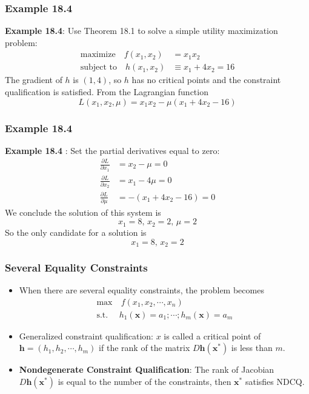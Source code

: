 \documentclass[9pt,aspectratio=169]{beamer}
\begin{document}
						
\begin{frame}
	\frametitle{Example 18.4} \textbf{Example 18.4}: Use Theorem 18.1 to
    solve a simple utility maximization problem:
	\begin{align}
	\text{maximize} \quad f(x_1,x_2) &= x_1x_2 \nonumber \\
	\text{subject to}\quad h(x_1,x_2)&\equiv x_1+4x_2 = 16 \nonumber 
	\end{align}
    The gradient of $h$ is $(1, 4)$, so $h$ has no critical points and the
    constraint qualification is satisfied. From the Lagrangian function
$$L(x_1,x_2,\mu) = x_1x_2-\mu(x_1+4x_2-16)$$
\end{frame}			
		
		
\begin{frame}
	\frametitle{Example 18.4}
	\textbf{Example 18.4} : Set the partial derivatives equal to zero:
	\begin{align}
        \frac{\partial L}{\partial x_1} & = x_2-\mu = 0 \nonumber \\
        \frac{\partial L}{\partial x_2} & = x_1-4\mu = 0 \nonumber \\
        \frac{\partial L}{\partial \mu} & = -(x_1+4x_2-16) = 0\nonumber
    \end{align}
    We conclude the solution of this system is
    $$x_1 = 8,\, x_2 = 2,\, \mu = 2$$ So the only candidate for
    a solution is $$x_1 = 8,\, x_2 = 2$$
\end{frame}		
		
		

	


	



	


\begin{frame}
	\frametitle{Several Equality Constraints}
\begin{itemize}
	\item When there are several equality constraints, the problem becomes
	\begin{align}
	\max & \ f(x_1,x_2,\cdots,x_n) \nonumber \\
	\text{s.t.}\ \ & h_1(\mathbf{x}) = a_1; \cdots; h_m(\mathbf{x}) = a_m \nonumber 
	\end{align}
    \item Generalized constraint qualification: $x$ is called a critical
    point of $\mathbf{h} = (h_1,h_2,\cdots,h_m)$ if the rank of the matrix
    $D\mathbf h(\mathbf{x}^*)$ is less than $m$.
    \item \textbf{Nondegenerate Constraint Qualification}: The rank of
    Jacobian $D\mathbf h(\mathbf{x}^*)$ is equal to the number of the constraints,
    then $\mathbf{x^*}$ satisfies NDCQ.
\end{itemize}
\end{frame}
\end{document}
